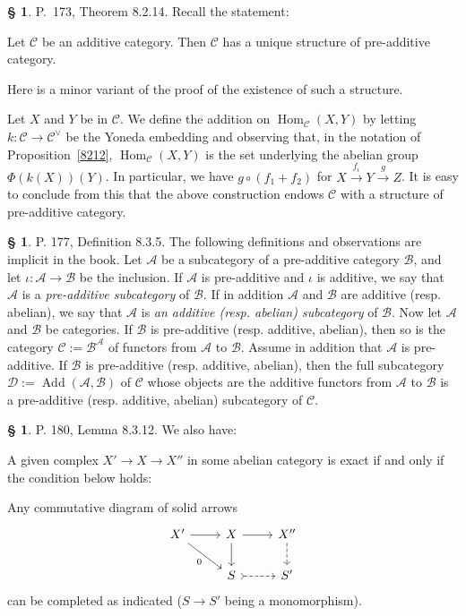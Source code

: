 \documentclass[12pt]{article}
\theoremstyle{remark}
\theoremstyle{definition}
\newtheorem{cm}[thm]{\S}
\newcommand{\bc}{\begin{cm}}\newcommand{\ec}{\end{cm}}
\newcommand{\cc}{\mathcal}
\newcommand{\C}{\mathcal C}
\newcommand{\xr}{\xrightarrow}
\newcommand{\pr}{Proposition}
\DeclareMathOperator{\Ad}{Add}
\DeclareMathOperator{\h}{Hom}
\begin{document}

\bc P.~173, Theorem 8.2.14. Recall the statement: 

Let $\C$ be an additive category. Then $\C$ has a unique structure of pre-additive category. 

Here is a minor variant of the proof of the existence of such a structure. 

Let $X$ and $Y$ be in $\C$. We define the addition on $\h_\C(X,Y)$ by letting $k:\C\to\C^\vee$ be the Yoneda embedding and observing that, in the notation of \pr\ \ref{8212}, $\h_\C(X,Y)$ is the set underlying the abelian group $\Phi(k(X))(Y)$. In particular, we have $g\circ(f_1+f_2)$ for $X\xr{f_i}Y\xr gZ$. It is easy to conclude from this that the above construction endows $\C$ with a structure of pre-additive category.
\ec 


\bc P. 177, Definition 8.3.5. The following definitions and observations are implicit in the book. Let $\cc A$ be a subcategory of a pre-additive category $\cc B$, and let $\iota:\cc A\to \cc B$ be the inclusion. If $\cc A$ is pre-additive and $\iota$ is additive, we say that $\cc A$ is a {\em pre-additive subcategory} of $\cc B$. If in addition $\cc A$ and $\cc B$ are additive (resp. abelian), we say that $\cc A$ is {\em an additive (resp. abelian) subcategory} of $\cc B$. Now let $\cc A$ and $\cc B$ be categories. If $\cc B$ is pre-additive (resp. additive, abelian), then so is the category $\cc C:=\cc B^\cc A$ of functors from $\cc A$ to $\cc B$. Assume in addition that $\cc A$ is pre-additive. If $\cc B$ is pre-additive (resp. additive, abelian), then the full subcategory $\cc D:=\Ad(\cc A,\cc B)$ of $\cc C$ whose objects are the additive functors from $\cc A$ to $\cc B$ is a pre-additive (resp. additive, abelian) subcategory of $\cc C$.
\ec 


\bc P. 180, Lemma 8.3.12. We also have:

A given complex $X'\to X\to X''$ in some abelian category is exact if and only if the condition below holds:

Any commutative diagram of solid arrows
$$
\begin{tikzcd}
X'\ar{dr}[swap]{0}\ar{r}&X\ar{d}\ar{r}&X''\ar[dashed]{d}\\ 
{}&S\ar[tail,dashed]{r}&S'
\end{tikzcd}
$$ 
can be completed as indicated ($S\to S'$ being a monomorphism).
\ec 

\end{document}
